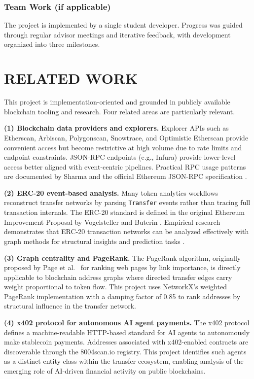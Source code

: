 \documentclass[a4paper,12pt]{report}
\begin{document}
\subsection{Team Work (if applicable)}

The project is implemented by a single student developer. Progress was guided through regular
advisor meetings and iterative feedback, with development organized into three milestones.

\chapter{RELATED WORK}

This project is implementation-oriented and grounded in publicly available blockchain tooling and
research. Four related areas are particularly relevant.

\textbf{(1) Blockchain data providers and explorers.}
Explorer APIs such as Etherscan, Arbiscan, Polygonscan, Snowtrace, and Optimistic Etherscan
\cite{etherscan_docs, arbiscan, polygonscan, snowtrace, optimistic_etherscan} provide convenient
access but become restrictive at high volume due to rate limits and endpoint constraints.
JSON-RPC endpoints (e.g., Infura) provide lower-level access better aligned with event-centric
pipelines. Practical RPC usage patterns are documented by Sharma \cite{sharma2020} and the
official Ethereum JSON-RPC specification \cite{ethereum_jsonrpc}.

\textbf{(2) ERC-20 event-based analysis.}
Many token analytics workflows reconstruct transfer networks by parsing \texttt{Transfer} events
rather than tracing full transaction internals. The ERC-20 standard is defined in the original
Ethereum Improvement Proposal by Vogelsteller and Buterin \cite{erc20}. Empirical research
demonstrates that ERC-20 transaction networks can be analyzed effectively with graph methods for
structural insights and prediction tasks \cite{somin2020}.

\textbf{(3) Graph centrality and PageRank.}
The PageRank algorithm, originally proposed by Page et al.~\cite{pagerank1999} for ranking web
pages by link importance, is directly applicable to blockchain address graphs where directed
transfer edges carry weight proportional to token flow. This project uses NetworkX's
weighted PageRank implementation with a damping factor of 0.85 to rank addresses by structural
influence in the transfer network.

\textbf{(4) x402 protocol for autonomous AI agent payments.}
The x402 protocol \cite{x402} defines a machine-readable HTTP-based standard for AI agents to
autonomously make stablecoin payments. Addresses associated with x402-enabled contracts are
discoverable through the 8004scan.io registry. This project identifies such agents as a distinct
entity class within the transfer ecosystem, enabling analysis of the emerging role of AI-driven
financial activity on public blockchains.
\end{document}
